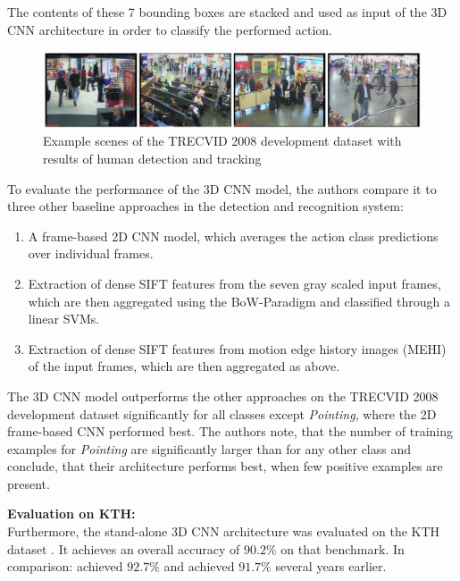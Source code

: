 The contents of these 7 bounding boxes are stacked and used as input of the 3D CNN architecture in order to classify the performed action.

\begin{figure}[H]
    \centering
    \includegraphics[width=\textwidth]{img_deep/3dconv_sampletracking}
    \caption{Example scenes of the TRECVID 2008 development dataset with results of human detection and tracking \cite{ji_3d_2013}}
    \label{fig:3dconv_sampletracking}
\end{figure}

To evaluate the performance of the 3D CNN model, the authors compare it to three other baseline approaches in the detection and recognition system:
\begin{enumerate}
    \item A frame-based 2D CNN model, which averages the action class predictions over individual frames.
    \item Extraction of dense SIFT features \cite{lowe_distinctive_2004} from the seven gray scaled input frames, which are then aggregated using the BoW-Paradigm and classified through a linear SVMs.
    \item Extraction of dense SIFT features \cite{lowe_distinctive_2004} from motion edge history images (MEHI)\cite{yang_human_2009} of the input frames, which are then aggregated as above.
\end{enumerate}

The 3D CNN model outperforms the other approaches on the TRECVID 2008 development dataset significantly for all classes except \textit{Pointing}, where the 2D frame-based CNN performed best.
The authors note, that the number of training examples for \textit{Pointing} are significantly larger than for any other class and conclude, that their architecture performs best, when few positive examples are present.

\textbf{Evaluation on KTH:}\\
Furthermore, the stand-alone 3D CNN architecture was evaluated on the KTH dataset \cite{schuldt_recognizing_2004}.
It achieves an overall accuracy of $90.2\%$ on that benchmark.
In comparison: \textcite{schindler_action_2008} achieved $92.7\%$ and \textcite{jhuang_biologically_2007} achieved $91.7\%$ several years earlier.

